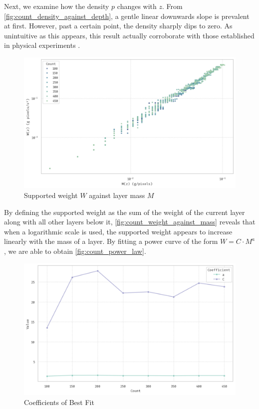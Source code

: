 \documentclass[a4paper,10pt]{article}
\begin{document}
\begin{multicols}{2}
    Next, we examine how the density $p$ changes with $z$. From \autoref{fig:count_density_against_depth},
    a gentle linear downwards slope is prevalent at first. However, past a certain point, the density
    sharply dips to zero. As unintuitive as this appears, this result actually corroborate with
    those established in physical experiments \cite{shishkov2022strength}.

    \begin{figure}[H]
        \centering
        \includegraphics[width=\linewidth]{bee_count_weight.pdf}
        \caption{Supported weight $W$ against layer mass $M$}
        \label{fig:count_weight_against_mass}
    \end{figure}

    By defining the supported weight as the sum of the weight of the current layer along with all
    other layers below it, \autoref{fig:count_weight_against_mass} reveals that when a logarithmic scale is used,
    the supported weight appears to increase linearly with the mass of a layer. By fitting
    a power curve of the form $W = C \cdot M^{a}$, we are able to obtain \autoref{fig:count_power_law}.

    \begin{figure}[H]
        \centering
        \includegraphics[width=\linewidth]{bee_count_power_law.pdf}
        \caption{Coefficients of Best Fit}
        \label{fig:count_power_law}
    \end{figure}


\end{multicols}
\end{document}
